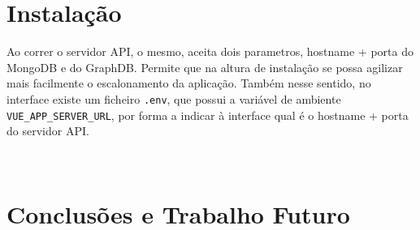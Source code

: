 \documentclass{article}
\begin{document}
\section{Instalação}

Ao correr o servidor API, o mesmo, aceita dois parametros, hostname + porta do MongoDB e do GraphDB. Permite que na altura de instalação se possa agilizar mais facilmente o escalonamento da aplicação. Também nesse sentido, no interface existe um ficheiro \texttt{.env}, que possui a variável de ambiente \texttt{VUE\_APP\_SERVER\_URL}, por forma a indicar à interface qual é o hostname + porta do servidor API.

~\cite{mbAnnotation}

\section{Conclusões e Trabalho Futuro}


\newpage 
\printbibliography

\begin{appendices}

\end{appendices}
\end{document}
